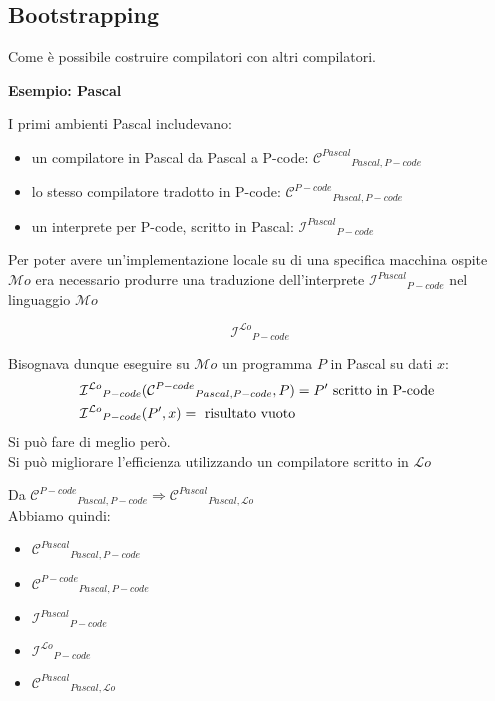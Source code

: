 \documentclass[a4paper,11pt,hidelinks]{book}
\theoremstyle{definition}
\begin{document}
    \subsection{Bootstrapping}
    Come è possibile costruire compilatori con altri compilatori.
    
    \textbf{Esempio: Pascal} 
    
    I primi ambienti Pascal includevano:
    \begin{itemize}
        \item un compilatore in Pascal da Pascal a P-code: $\mathcal{C}^{Pascal}{_{Pascal, P-code}}$
        \item lo stesso compilatore tradotto in P-code: $\mathcal{C}^{P-code}{_{Pascal, P-code}}$
        \item un interprete per P-code, scritto in Pascal: $\mathcal{I}^{Pascal}{_{P-code}}$
    \end{itemize}
    \newpage
    Per poter avere un'implementazione locale su di una specifica macchina ospite $\mathcal{M}o$ era necessario produrre una traduzione dell'interprete $\mathcal{I}^{Pascal}{_{P-code}}$ nel linguaggio $\mathcal{M}o$
    
    \[\mathcal{I}^{\mathcal{L}o}{_{P-code}}\]
    
    Bisognava dunque eseguire su $\mathcal{M}o$ un programma $P$ in Pascal su dati $x$:
    \begin{align*}
        & \mathcal{I}^{\mathcal{L}o}{_{P-code}}(\mathcal{C}^{P-code}{_{Pascal, P-code}}, P) = P' \textnormal{ scritto in P-code } \\
        & \mathcal{I}^{\mathcal{L}o}{_{P-code}}(P', x) = \textnormal{ risultato vuoto }
    \end{align*}
    Si può fare di meglio però. \\
    Si può migliorare l'efficienza utilizzando un compilatore scritto in $\mathcal{L}o$
    
    Da $\mathcal{C}^{P-code}{_{Pascal, P-code}} \Longrightarrow \mathcal{C}^{Pascal}{_{Pascal, \mathcal{L}o}}$ \\
    Abbiamo quindi:
    \begin{itemize}
        \item $\mathcal{C}^{Pascal}{_{Pascal, P-code}}$
        \item $\mathcal{C}^{P-code}{_{Pascal, P-code}}$
        \item $\mathcal{I}^{Pascal}{_{P-code}}$
        \item $\mathcal{I}^{\mathcal{L}o}{_{P-code}}$
        \item $\mathcal{C}^{Pascal}{_{Pascal, \mathcal{L}o}}$
    \end{itemize}
    
\end{document}
